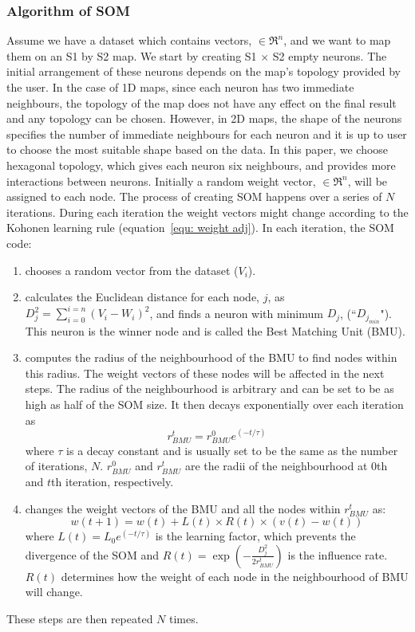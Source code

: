  \subsubsection{Algorithm of SOM} 
 \label{sec: algorithm}
     Assume we have a dataset which contains vectors,  $\in \Re^n$, and we want to map them on an S1 by S2 map. 
     We start by creating S1 $\times$ S2 empty neurons. 
     The initial arrangement of these neurons depends on the map's topology provided by the user.
     In the case of 1D maps, since each neuron has two immediate neighbours, the topology of the map does not have any effect on the final result and any topology can be chosen.
     However, in 2D maps, the shape of the neurons specifies the number of immediate neighbours for each neuron and it is up to user to choose the most suitable shape based on the data.
     In this paper, we choose hexagonal topology, which gives each neuron six neighbours, and provides more interactions between neurons.
     Initially a random weight vector,  $\in \Re^n$, will be assigned to each node.
     The process of creating SOM happens over a series of $N$ iterations. 
     During each iteration the weight vectors might change according to the Kohonen learning rule (equation~\ref{equ: weight adj}). 
      In each iteration, the SOM code:
     \begin{enumerate}
        \item chooses a random vector from the dataset ($V_i$).
        \item calculates the Euclidean distance for each node, $j$, as  $D_j^2= \sum_{i=0}^{i=n} (V_i - W_i)^2$, and finds a neuron with minimum $D_j$, (``$D_{j_{min}}$"). This neuron is the winner node and is called the Best Matching Unit (BMU). 
        \item  computes the radius of the neighbourhood of the BMU to find nodes within this radius. The weight vectors of these nodes will be affected in the next steps. The radius of the neighbourhood is arbitrary and can be set to be as high as half of the SOM size. It then decays exponentially over each iteration as
        \begin{equation}
            r^t_{BMU} = r^0_{BMU}e^{(-t/\tau)}
        \end{equation}
        where $\tau$ is a decay constant and is usually set to be the same as the number of iterations, $N$. $r^0_{BMU}$ and $r^t_{BMU}$ are the radii of the neighbourhood at 0th and $t$th iteration, respectively. 
        \item changes the weight vectors of the BMU and all the nodes within $r^t_{BMU}$ as:
        \begin{equation}
            \label{equ: weight adj}
            w(t+1)=w(t)+L(t) \times R(t) \times(v(t)-w(t))
        \end{equation}
        where $L(t) = L_0 e^{(-t/\tau)}$ is the learning factor, which prevents the divergence of the SOM and $R(t)=\exp(-\frac{D_j^2}{2r^t_{BMU}})$ is the influence rate. $R(t)$ determines how the weight of each node in the neighbourhood of BMU will change.
     \end{enumerate}
     These steps are then repeated $N$ times.
     
